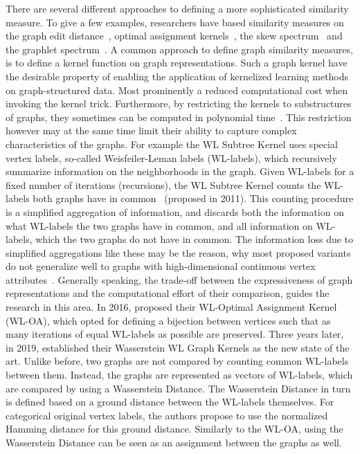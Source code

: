 	There are several different approaches to defining a more sophisticated similarity measure.
	To give a few examples, researchers have based similarity measures on the graph edit distance~\cite{1983_Bunke_ELSEVIER,2005_Froehlich_ICML}, optimal assignment kernels~\cite{2005_Froehlich_ICML}, the
	skew spectrum~\cite{2008_Kondor_ICML} and the graphlet spectrum~\cite{2009_Kondor_ICML, 2009_Shervashidze_NIPS}.
	A common approach to define graph similarity measures, is to define a kernel function on graph representations.
	Such a graph kernel have the desirable property of enabling the application of kernelized learning methods on graph-structured data.
	Most prominently a reduced computational cost when invoking the kernel trick.
	Furthermore, by restricting the kernels to substructures of graphs, they sometimes can be computed in polynomial time~\cite{1999_Haussler_CONF, 2008_Hofmann_CONF}.
	This restriction however may at the same time limit their ability to capture complex characteristics of the graphs.	
	For example the WL Subtree Kernel uses special vertex labels, so-called Weisfeiler-Leman labels (WL-labels), which recursively summarize information on the neighborhoods in the graph.
	Given WL-labels for a fixed number of iterations (recursions), the WL Subtree Kernel counts the WL-labels both graphs have in common~\cite{2011_Shervashidze_JMLR} (proposed in 2011).
	This counting procedure is a simplified aggregation of information, and discards both the information on what WL-labels the two graphs have in common, and all information on WL-labels, which the two graphs do not have in common.
	The information loss due to simplified aggregations like these may be the reason, why most proposed variants do not generalize well to graphs with high-dimensional continuous vertex attributes~\cite{2011_Shervashidze_JMLR}. 
	Generally speaking, the trade-off between the expressiveness of graph representations and the computational effort of their comparison, guides the research in this area.
	In 2016, \citeauthor{2016_Kriege_NIPS} proposed their WL-Optimal Assignment Kernel (WL-OA), which opted for defining a bijection between vertices such that as many iterations of equal WL-labels as possible are preserved.
	Three years later, in 2019, \citeauthor{2019_Togninalli_NIPS} established their Wasserstein WL Graph Kernels as the new state of the art.
	Unlike before, two graphs are not compared by counting common WL-labels between them.	
	Instead, the graphs are represented as vectors of WL-labels, which are compared by using a Wasserstein Distance.
	The Wasserstein Distance in turn is defined based on a ground distance between the WL-labels themselves.
	For categorical original vertex labels, the authors propose to use the normalized Hamming distance for this ground distance.	 
	Similarly to the WL-OA, using the Wasserstein Distance can be seen as an assignment between the graphs as well.
	
